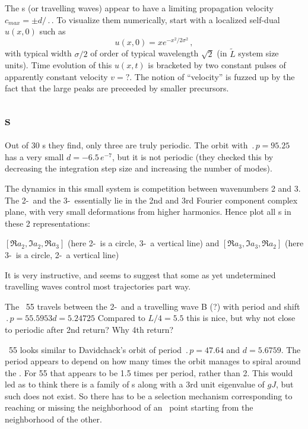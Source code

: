 The \reqva s (or travelling waves) appear to have a limiting propagation
velocity $c_{max} = \pm d/\period{}$. 
To visualize them numerically,
start with a localized self-dual $u(x,0)$ such as
\[
u(x,0) = x e^{- x^2/2\sigma^2}
\,,
\]
with typical width $\sigma/2$ of order of typical wavelength 
$\sqrt{2}$ (in $\tilde{L}$ system size units).
Time evolution of this  $u(x,t)$ is bracketed by two constant 
pulses of apparently constant velocity $v=?$.
The notion of ``velocity''
is fuzzed up by the fact that the large peaks are preceeded
by smaller precursors.



\subsection{\Rpo s}

%
Out of 30 \rpo s they
find,  only three are truly periodic.  The orbit
with $\period{p} = 95.25$ has a very small
$d = -6.5\,e^{-7}$, but it is not periodic 
(they
checked this by decreasing the integration step size and increasing the
number of modes).

The dynamics in this small system is competition between wavenumbers
2 and 3. The 2-\eqv\  and the 3-\eqv\  essentially lie in
the 2nd and 3rd Fourier component complex plane, with very
small deformations from higher harmonics.
Hence plot all \rpo s in these 2 representations:

$[ \Re a_2, \Im a_2, \Re a_3 ]$
(here 2-\eqv\  is a circle, 3-\eqv\ a vertical line)
 and
$[ \Re a_3, \Im a_3, \Re a_2 ]$
(here 3-\eqv\ is a circle, 2-\eqv\ a vertical line)

It is very instructive, and seems to suggest that some as yet
undetermined travelling waves control most trajectories part way.

The \rpo\ {\nameit}55 travels between the 2-\eqv\  and a
travelling wave B (?) 
with period and shift
$\period{p}=55.5953 d=5.24725$
Compared to $L/4 = 5.5$
this is nice, but why not close to periodic after 2nd return? Why 4th return?

\Rpo\ {\nameit}55 looks similar to Davidchack's  orbit
of period 
$\period{p}=47.64$ and $d=5.6759$. The period appears to depend on how
many times the orbit manages to spiral around the \eqv.
For {\nameit}55 that appears to be
1.5 times per period, rather than 2. This would led as
to
think there is a family of \rpo s along with a 3rd unit eigenvalue of
$gJ$,
but such does not exist.
So there has to be a selection mechanism corresponding to
reaching or missing the neighborhood of an \eqv\  point starting from
the neighborhood of the other. 

